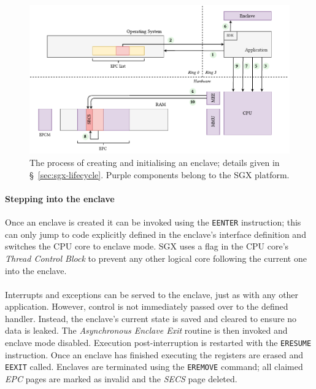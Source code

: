 \begin{figure}[]
    \centering
    \includegraphics[width=\linewidth]{figures/SGX-EnclaveCreate.pdf}
    \caption{The process of creating and initialising an enclave; details given in §~\ref{sec:sgx-lifecycle}. Purple components belong to the SGX platform.}
    \label{fig:sgx-enclavecreate}
\end{figure}

\paragraph{Stepping into the enclave} Once an enclave is created it can be invoked using the \texttt{EENTER} instruction; this can only jump to code explicitly defined in the enclave's interface definition and switches the CPU core to enclave mode. SGX uses a flag in the CPU core's \textit{Thread Control Block} to prevent any other logical core following the current one into the enclave.

\paragraph{} Interrupts and exceptions can be served to the enclave, just as with any other application. However, control is not immediately passed over to the defined handler. Instead, the enclave's current state is saved and cleared to ensure no data is leaked. The \textit{Asynchronous Enclave Exit} routine is then invoked and enclave mode disabled. Execution post-interruption is restarted with the \texttt{ERESUME} instruction. Once an enclave has finished executing the registers are erased and \texttt{EEXIT} called. Enclaves are terminated using the \texttt{EREMOVE} command; all claimed \textit{EPC} pages are marked as invalid and the \textit{SECS} page deleted.

